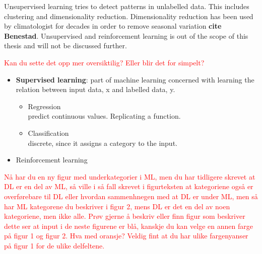 \documentclass{article}
\begin{document}
Unsupervised learning tries to detect patterns in unlabelled data. This includes clustering and dimensionality reduction. Dimensionality reduction has been used by climatologist for decades in order to remove seasonal variation \textbf{cite Benestad}. Unsupervised and reinforcement learning is out of the scope of this thesis and will not be discussed further.
 
\textcolor{red}{Kan du sette det opp mer oversiktilig? Eller blir det for simpelt?}
\begin{itemize}
    \item \textbf{Supervised learning}: part of machine learning concerned with learning the relation between input data, x and labelled data, y.
    \begin{itemize}
        \item Regression\\predict continuous values. Replicating a function.
        \item Classification\\discrete, since it assigns a category to the input.
    \end{itemize}
    \item Reinforcement learning
\end{itemize}

\textcolor{red}{Nå har du en ny figur med underkategorier i ML, men du har tidligere skrevet at DL er en del av ML, så ville i så fall skrevet i figurteksten at kategoriene også er overførebare til DL eller hvordan sammenhnegen med at DL er under ML, men så har ML kategorene du beskriver i figur 2, mens DL er det en del av noen kategoriene, men ikke alle. Prøv gjerne å beskriv eller finn figur som beskriver dette }
\textcolor{red}{ser at input i de neste figurene er blå, kanskje du kan velge en annen farge på figur 1 og figur 2. Hva med oransje? Veldig fint at du har ulike fargenyanser på figur 1 for de ulike delfeltene.}
\end{document}
